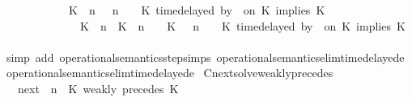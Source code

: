 \begin{isabellebody}
\ \ \ \ \ \ \ \ \ \ {\isasymsupseteq}\ {\isacharbraceleft}\ {\isacharparenleft}{\isacharparenleft}K\ {\isasymnot}{\isasymUp}\ n{\isacharparenright}\ {\isacharhash}\ {\isasymGamma}{\isacharparenright}{\isacharcomma}\ n\ {\isasymturnstile}\ {\isasymPsi}\ {\isasymtriangleright}\ {\isacharparenleft}{\isacharparenleft}K\ time{\isacharminus}delayed\ by\ {\isasymdelta}{\isasymtau}\ on\ K\ implies\ K\ {\isacharhash}\ {\isasymPhi}{\isacharparenright}{\isacharcomma}\isanewline
\ \ \ \ \ \ \ \ \ \ \ \ \ \ {\isacharparenleft}{\isacharparenleft}K\ {\isasymUp}\ n{\isacharparenright}\ {\isacharhash}\ {\isacharparenleft}K\ {\isacharat}\ n\ {\isasymoplus}\ {\isasymdelta}{\isasymtau}\ {\isasymRightarrow}\ K\ {\isacharhash}\ {\isasymGamma}{\isacharparenright}{\isacharcomma}\ n\ {\isasymturnstile}\ {\isasymPsi}\ {\isasymtriangleright}\ {\isacharparenleft}{\isacharparenleft}K\ time{\isacharminus}delayed\ by\ {\isasymdelta}{\isasymtau}\ on\ K\ implies\ K\ {\isacharhash}\ {\isasymPhi}{\isacharparenright}\ {\isacharbraceright}{\isachardoublequoteclose}\isanewline
%
\isadelimproof
\ \ %
\endisadelimproof
%
\isatagproof
{}\isamarkupfalse%
\ {\isacharparenleft}simp\ add{\isacharcolon}\ operational{\isacharunderscore}semantics{\isacharunderscore}step{\isachardot}simps\ operational{\isacharunderscore}semantics{\isacharunderscore}elim{\isachardot}timedelayed{\isacharunderscore}e{}\ operational{\isacharunderscore}semantics{\isacharunderscore}elim{\isachardot}timedelayed{\isacharunderscore}e{}{\isacharparenright}%
\endisatagproof
{\isafoldproof}%
%
\isadelimproof
\isanewline
%
\endisadelimproof
\isanewline
{}\isamarkupfalse%
\ Cnext{\isacharunderscore}solve{\isacharunderscore}weakly{\isacharunderscore}precedes{\isacharcolon}\isanewline
\ \ \ {\isachardoublequoteopen}{\isacharparenleft}{\isasymC}\isactrlsub n\isactrlsub e\isactrlsub x\isactrlsub t\ {\isacharparenleft}{\isasymGamma}{\isacharcomma}\ n\ {\isasymturnstile}\ {\isacharparenleft}{\isacharparenleft}K\ weakly\ precedes\ K\ {\isacharhash}\ {\isasymPsi}{\isacharparenright}\ {\isasymtriangleright}\ {\isasymPhi}{\isacharparenright}{\isacharparenright}\isanewline

\end{isabellebody}
